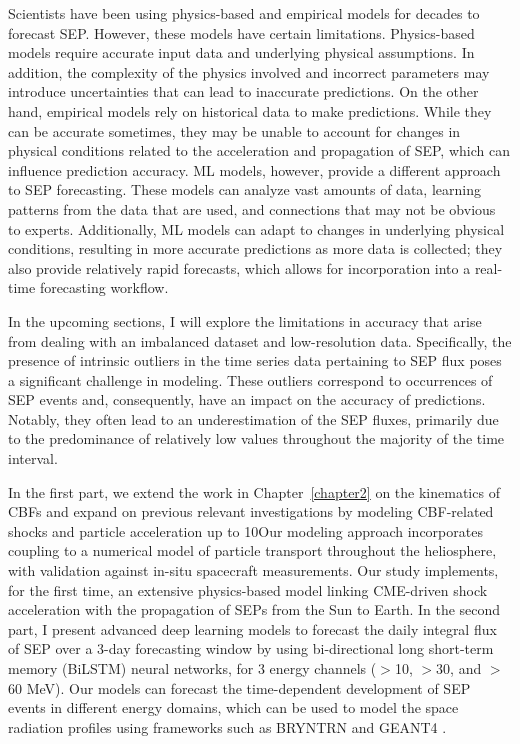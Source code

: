 Scientists have been using physics-based and empirical models for decades to forecast SEP. However, these models have certain limitations. Physics-based models require accurate input data and underlying physical assumptions. In addition, the complexity of the physics involved and incorrect parameters may introduce uncertainties that can lead to inaccurate predictions.
On the other hand, empirical models rely on historical data to make predictions.
While they can be accurate sometimes, they may be unable to account for changes in physical conditions related to the acceleration and propagation of SEP, which can influence prediction accuracy.
ML models, however, provide a different approach to SEP forecasting. These models can analyze vast amounts of data, learning patterns from the data that are used, and connections that may not be obvious to experts. Additionally, ML models can adapt to changes in underlying physical conditions, resulting in more accurate predictions as more data is collected; they also provide relatively rapid forecasts, which allows for incorporation into a real-time forecasting workflow.

In the upcoming sections, I will explore the limitations in accuracy that arise from dealing with an imbalanced dataset and low-resolution data. Specifically, the presence of intrinsic outliers in the time series data pertaining to SEP flux poses a significant challenge in modeling. These outliers correspond to occurrences of SEP events and, consequently, have an impact on the accuracy of predictions. Notably, they often lead to an underestimation of the SEP fluxes, primarily due to the predominance of relatively low values throughout the majority of the time interval.

In the first part, we extend the work in Chapter~\ref{chapter2} on the kinematics of CBFs and expand on previous relevant investigations by modeling CBF-related shocks and particle acceleration up to 10\rsun Our modeling approach incorporates coupling to a numerical model of particle transport throughout the heliosphere, with validation against in-situ spacecraft measurements. Our study implements, for the first time, an extensive physics-based model linking CME-driven shock acceleration with the propagation of SEPs from the Sun to Earth. In the second part, I present advanced deep learning models to forecast the daily integral flux of SEP over a 3-day forecasting window by using bi-directional long short-term memory (BiLSTM) neural networks, for 3 energy channels ($>$10, $>$30, and $>$60 MeV). Our models can forecast the time-dependent development of SEP events in different energy domains, which can be used to model the space radiation profiles using frameworks such as BRYNTRN \cite{wilson_1988} and GEANT4 \citep{truscott_2000}.

